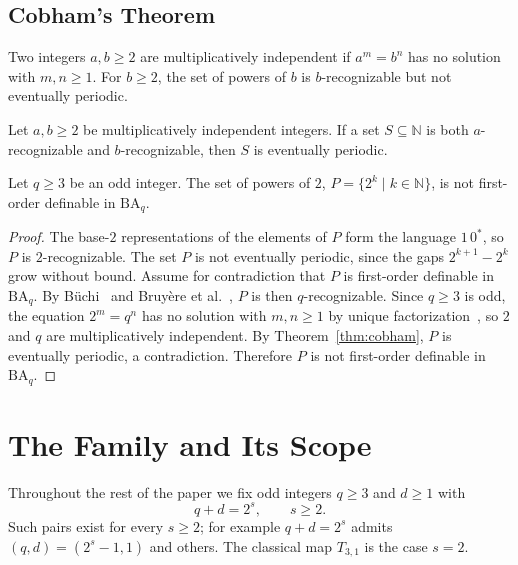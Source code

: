 \documentclass[runningheads]{llncs}
\begin{document}
\subsection{Cobham's Theorem}

Two integers $a,b \ge 2$ are multiplicatively independent if $a^m = b^n$
has no solution with $m,n \ge 1$. For $b \ge 2$, the set of powers of
$b$ is $b$-recognizable but not eventually periodic.

\begin{theorem}\label{thm:cobham}
Let $a,b \ge 2$ be multiplicatively independent integers. If a set $S
\subseteq \mathbb{N}$ is both $a$-recognizable and $b$-recognizable,
then $S$ is eventually periodic.
\end{theorem}

\begin{lemma}\label{lem:undefinable_subset}
Let $q \ge 3$ be an odd integer. The set of powers of $2$, $P = \{2^k
\mid k \in \mathbb{N}\}$, is not first-order definable in
$\mathrm{BA}_q$.
\end{lemma}
\begin{proof}
The base-$2$ representations of the elements of $P$ form the language
$1\,0^{*}$, so $P$ is $2$-recognizable. The set $P$ is not eventually
periodic, since the gaps $2^{k+1}-2^k$ grow without bound. Assume for
contradiction that $P$ is first-order definable in $\mathrm{BA}_q$. By
B\"uchi~\cite{Buchi} and Bruy\`ere et al.~\cite{Bruyere}, $P$ is then
$q$-recognizable. Since $q \ge 3$ is odd, the equation $2^m = q^n$ has
no solution with $m,n \ge 1$ by unique factorization~\cite{HardyWright},
so $2$ and $q$ are multiplicatively independent. By
Theorem~\ref{thm:cobham}, $P$ is eventually periodic, a contradiction.
Therefore $P$ is not first-order definable in $\mathrm{BA}_q$.
\end{proof}

\section{The Family and Its Scope}
\label{sec:scope}

Throughout the rest of the paper we fix odd integers $q \ge 3$ and $d
\ge 1$ with
\[
q + d = 2^{s}, \qquad s \ge 2.
\]
Such pairs exist for every $s \ge 2$; for example $q+d=2^s$ admits
$(q,d) = (2^s-1, 1)$ and others. The classical map $T_{3,1}$ is the
case $s = 2$.
\end{document}
